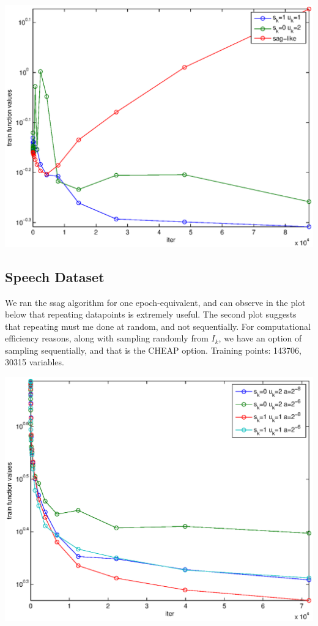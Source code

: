 \documentclass[12pt]{article}
\begin{document}
	\begin{center}
	\includegraphics{Figures/12-5.eps}    
	\end{center}
	
	\subsection{Speech Dataset}
	
	We ran the ssag algorithm for one epoch-equivalent, and can observe in the plot below that repeating datapoints is extremely useful. The second plot suggests that repeating must me done at random, and not sequentially. For computational efficiency reasons, along with sampling randomly from $I_k$, we have an option of sampling sequentially, and that is the CHEAP option. Training points: 143706, 30315 variables. 
	
	
	\begin{center}
	\includegraphics{Figures/12-6.eps}    
	\end{center}
\end{document}
